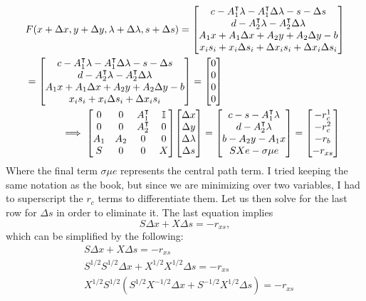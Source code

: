 \begin{solution}
    \alignbreak
    \begin{align*}
        &F(x + \Delta x, y + \Delta y, \lm + \Delta\lm, s + \Delta s) = \mqty[c - A_1\T \lm - A_1\T\Delta\lm - s - \Delta s\\d - A_2\T \lm - A_2\T \Delta\lm\\A_1x + A_1\Delta x + A_2 y + A_2 \Delta y - b\\x_is_i + x_i\Delta s_i + \Delta x_i s_i + \Delta x_i \Delta s_i]\\
        &= \mqty[c - A_1\T \lm - A_1\T\Delta\lm - s - \Delta s\\d - A_2\T \lm - A_2\T \Delta\lm\\A_1x + A_1\Delta x + A_2 y + A_2 \Delta y - b\\x_is_i + x_i\Delta s_i + \Delta x_i s_i] = \mqty[0\\0\\0\\0]\\
        &\hspace{12mm}\implies \mqty[0&0&A_1\T&\id\\0&0&A_2\T&0\\A_1&A_2&0&0\\S&0&0&X]\mqty[\Delta x\\\Delta y\\\Delta \lm \\\Delta s] = \mqty[c - s - A_1\T\lm\\d - A_2\T \lm\\b - A_2y - A_1x\\SXe - \sigma\mu e] = \mqty[-r^1_c\\-r_c^2\\-r_b\\-r_{xs}]
    \end{align*}
    \alignbreak
    Where the final term $\sigma \mu e$ represents the central path term. I tried keeping the same notation as the book, but since we are minimizing over two variables, I had to superscript the $r_c$ terms to differentiate them. Let us then solve for the last row for $\Delta s$ in order to eliminate it. The last equation implies 
    \[S\Delta x + X\Delta s = -r_{xs},\]
    which can be simplified by the following:
    \newcommand{\h}{^{1/2}}
    \newcommand{\mh}{^{-1/2}}
    \alignbreak
    \begin{align*}
        &S\Delta x + X\Delta s = -r_{xs}\\
        &S\h S\h \Delta x + X\h X\h \Delta s = -r_{xs}\\
        &X\h S\h (S\h X\mh \Delta x + S\mh X\h \Delta s) = -r_{xs}\\

\end{align*}
\end{solution}
